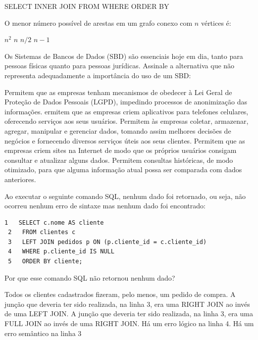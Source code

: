 \documentclass[12pt, addpoints]{exam}
\begin{document}
\begin{questions}
\begin{choices}
\choice SELECT
\choice INNER JOIN
\choice FROM
\choice WHERE
\choice ORDER BY
\end{choices}

\question
O menor número possível de arestas em um grafo conexo com \( n \) vértices é:
\begin{choices}
\choice \( n^2 \)
\choice \( n \)
\choice \( n/2 \)
\choice \( n - 1 \)
\end{choices}

\question
Os Sistemas de Bancos de Dados (SBD) são essenciais hoje em dia, tanto para
pessoas físicas quanto para pessoas jurídicas. Assinale a alternativa que não
representa adequadamente a importância do uso de um SBD:
\begin{choices}
\choice Permitem que as empresas tenham mecanismos de obedecer à Lei Geral de Proteção de Dados Pessoais (LGPD), impedindo processos de anonimização das informações.
\choice ermitem que as empresas criem aplicativos para telefones celulares, oferecendo serviços aos seus usuários.
\choice Permitem às empresas coletar, armazenar, agregar, manipular e gerenciar dados, tomando assim melhores decisões de negócios e fornecendo diversos serviços úteis aos seus clientes.
\choice Permitem que as empresas criem sites na Internet de modo que os próprios usuários consigam consultar e atualizar alguns dados.
\choice Permitem consultas históricas, de modo otimizado, para que alguma informação atual possa ser comparada com dados anteriores.
\end{choices}

\question
Ao executar o seguinte comando SQL, nenhum dado foi retornado, ou seja, não
ocorreu nenhum erro de sintaxe mas nenhum dado foi encontrado:
\begin{tcolorbox}
 \begin{verbatim}1   SELECT c.nome AS cliente
 2   FROM clientes c
 3   LEFT JOIN pedidos p ON (p.cliente_id = c.cliente_id)
 4   WHERE p.cliente_id IS NULL
 5   ORDER BY cliente;
 \end{verbatim}
\end{tcolorbox}
Por que esse comando SQL não retornou nenhum dado?

\begin{choices}
\choice Todos os clientes cadastrados fizeram, pelo menos, um pedido de compra.
\choice A junção que deveria ter sido realizada, na linha 3, era uma RIGHT JOIN ao invés de uma LEFT JOIN.
\choice A junção que deveria ter sido realizada, na linha 3, era uma FULL JOIN ao invés de uma RIGHT JOIN.
\choice Há um erro lógico na linha 4.
\choice Há um erro semântico na linha 3
\end{choices}


\end{questions}
\end{document}
